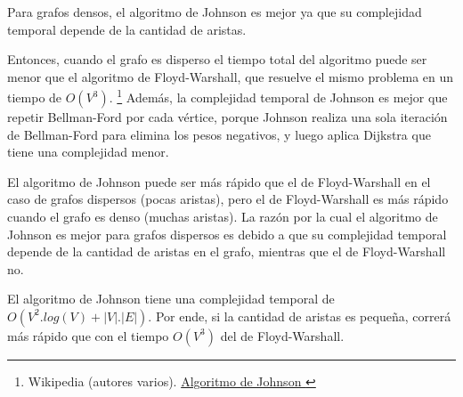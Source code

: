 \documentclass[../tp2_grupo404.tex]{subfiles}
\begin{document}
Para grafos densos, el algoritmo de Johnson es mejor ya que su complejidad
temporal depende de la cantidad de aristas.

Entonces, cuando el grafo es disperso el tiempo total del algoritmo
puede ser menor que el algoritmo de Floyd-Warshall, que resuelve el
mismo problema en un tiempo de $O(V^3)$.
\footnote{Wikipedia (autores varios).
\href{https://es.wikipedia.org/wiki/Algoritmo_de_Johnson}{\guillemotleft Algoritmo de Johnson \guillemotright}}
Además, la complejidad temporal de Johnson es mejor que
repetir Bellman-Ford por cada vértice, porque Johnson realiza una sola
iteración de Bellman-Ford para elimina los pesos negativos,
y luego aplica Dijkstra que tiene una complejidad menor.

El algoritmo de Johnson puede ser más rápido que el de Floyd-Warshall en el caso  
de grafos dispersos (pocas aristas), pero el de Floyd-Warshall es más rápido  
cuando el grafo es denso (muchas aristas). La razón por la cual el algoritmo de  
Johnson es mejor para grafos dispersos es debido a que su complejidad temporal  
depende de la cantidad de aristas en el grafo, mientras que el de Floyd-Warshall no. 
\par 
El algoritmo de Johnson tiene una complejidad temporal de $O(V^2.log(V)+|V|.|E|)$.  
Por ende, si la cantidad de aristas es pequeña, correrá más rápido que con el  
tiempo $O(V^3)$ del de Floyd-Warshall.

\end{document}
